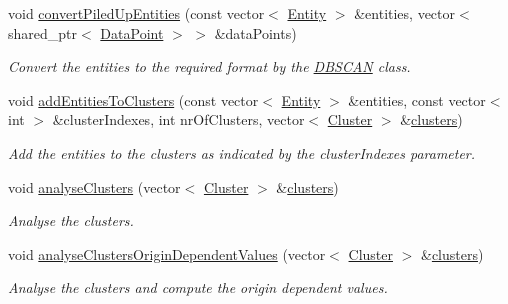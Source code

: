 \begin{DoxyCompactItemize}
void \hyperlink{classmultiscale_1_1analysis_1_1ClusterDetector_a22ba21c341448af455111e718b058391}{convert\-Piled\-Up\-Entities} (const vector$<$ \hyperlink{classmultiscale_1_1analysis_1_1Entity}{\-Entity} $>$ \&entities, vector$<$ shared\-\_\-ptr$<$ \hyperlink{classmultiscale_1_1analysis_1_1DataPoint}{\-Data\-Point} $>$ $>$ \&data\-Points)
\begin{DoxyCompactList}\small\item\em \-Convert the entities to the required format by the \hyperlink{classmultiscale_1_1analysis_1_1DBSCAN}{\-D\-B\-S\-C\-A\-N} class. \end{DoxyCompactList}\item 
void \hyperlink{classmultiscale_1_1analysis_1_1ClusterDetector_aefc4d0736d8af4ab53f1e5e76440f447}{add\-Entities\-To\-Clusters} (const vector$<$ \hyperlink{classmultiscale_1_1analysis_1_1Entity}{\-Entity} $>$ \&entities, const vector$<$ int $>$ \&cluster\-Indexes, int nr\-Of\-Clusters, vector$<$ \hyperlink{classmultiscale_1_1analysis_1_1Cluster}{\-Cluster} $>$ \&\hyperlink{classmultiscale_1_1analysis_1_1ClusterDetector_aa81a8649bc743389c2fc1919d47eb5b3}{clusters})
\begin{DoxyCompactList}\small\item\em \-Add the entities to the clusters as indicated by the cluster\-Indexes parameter. \end{DoxyCompactList}\item 
void \hyperlink{classmultiscale_1_1analysis_1_1ClusterDetector_af994e960ba3cd76cc67e714ea276264a}{analyse\-Clusters} (vector$<$ \hyperlink{classmultiscale_1_1analysis_1_1Cluster}{\-Cluster} $>$ \&\hyperlink{classmultiscale_1_1analysis_1_1ClusterDetector_aa81a8649bc743389c2fc1919d47eb5b3}{clusters})
\begin{DoxyCompactList}\small\item\em \-Analyse the clusters. \end{DoxyCompactList}\item 
void \hyperlink{classmultiscale_1_1analysis_1_1ClusterDetector_affff27bd4559d1272913ff1bceb229b5}{analyse\-Clusters\-Origin\-Dependent\-Values} (vector$<$ \hyperlink{classmultiscale_1_1analysis_1_1Cluster}{\-Cluster} $>$ \&\hyperlink{classmultiscale_1_1analysis_1_1ClusterDetector_aa81a8649bc743389c2fc1919d47eb5b3}{clusters})
\begin{DoxyCompactList}\small\item\em \-Analyse the clusters and compute the origin dependent values. \end{DoxyCompactList}\item 

\end{DoxyCompactItemize}
